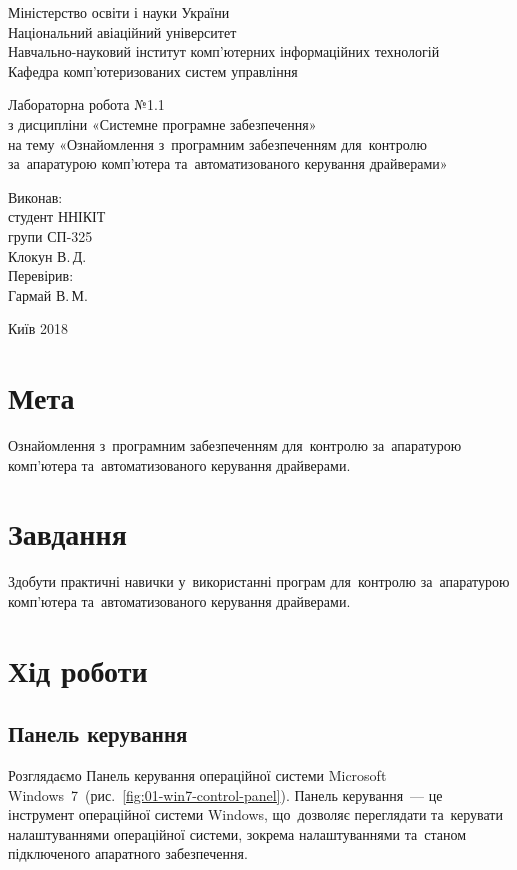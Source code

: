 \documentclass[
	a4paper,
	oneside,
	DIV = 12,
	BCOR = 10mm,
	12pt,
	headings = normal,
]{scrartcl}
\newcommand{\allcaps}[1]{{\addfontfeatures{LetterSpace = 5}#1}}
\begin{document}
	\begin{titlepage}
		\begin{center}
			Міністерство освіти і науки України\\
			Національний авіаційний університет\\
			Навчально-науковий інститут комп'ютерних інформаційних технологій\\
			Кафедра комп'ютеризованих систем управління

			\vspace{\fill}
				Лабораторна робота №1.1\\
				з дисципліни «Системне програмне забезпечення»\\
				на тему «Ознайомлення з~програмним забезпеченням для~контролю за~апаратурою комп'ютера та~автоматизованого керування драйверами»\\

			\vspace{\fill}

			\begin{flushright}
				Виконав:\\
				студент \allcaps{ННІКІТ}\\
				групи СП-325\\
				Клокун В.\,Д.\\
				Перевірив:\\
				Гармай В.\,М.
			\end{flushright}

			Київ 2018
		\end{center}
	\end{titlepage}

	\section{Мета}
		Ознайомлення з~програмним забезпеченням для~контролю за~апаратурою комп'\-ю\-те\-ра та~автоматизованого керування драйверами.

	\section{Завдання}
		Здобути практичні навички у~використанні програм для~контролю за~апаратурою комп'\-\-ю\-те\-ра та~автоматизованого керування драйверами.
		
	\section{Хід роботи}
		\subsection{Панель керування}
			Розглядаємо Панель керування операційної системи Microsoft Windows~7~(рис.~\ref{fig:01-win7-control-panel}). Панель керування~— це інструмент операційної системи Windows, що~дозволяє переглядати та~керувати налаштуваннями операційної системи, зокрема налаштуваннями та~станом підключеного апаратного забезпечення.
\end{document}
